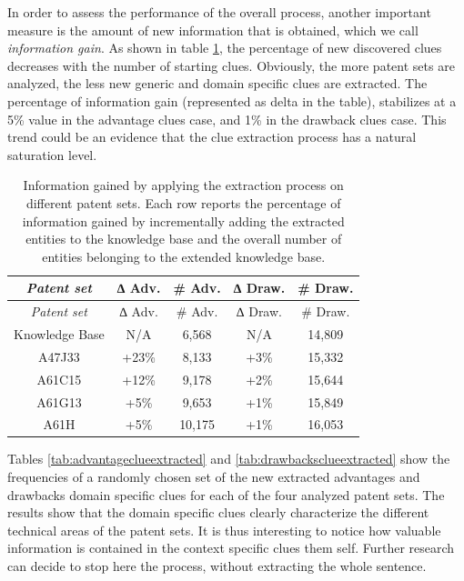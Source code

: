 \documentclass[b5paper,]{book}
\theoremstyle{definition}
\theoremstyle{definition}
\theoremstyle{definition}
\theoremstyle{remark}
\begin{document}
In order to assess the performance of the overall process, another
important measure is the amount of new information that is obtained,
which we call \emph{information gain}. As shown in table
\ref{tab:infogain1}, the percentage of new discovered clues decreases
with the number of starting clues. Obviously, the more patent sets are
analyzed, the less new generic and domain specific clues are extracted.
The percentage of information gain (represented as delta in the table),
stabilizes at a 5\% value in the advantage clues case, and 1\% in the
drawback clues case. This trend could be an evidence that the clue
extraction process has a natural saturation level.

\begin{longtable}[]{@{}ccccc@{}}
\caption{\label{tab:infogain1} Information gained by applying the extraction
process on different patent sets. Each row reports the percentage of
information gained by incrementally adding the extracted entities to the
knowledge base and the overall number of entities belonging to the
extended knowledge base.}\tabularnewline
\toprule
\emph{Patent set} & ∆ Adv. & \# Adv. & ∆ Draw. & \# Draw.\tabularnewline
\midrule
\endfirsthead
\toprule
\emph{Patent set} & ∆ Adv. & \# Adv. & ∆ Draw. & \# Draw.\tabularnewline
\midrule
\endhead
Knowledge Base & N/A & 6,568 & N/A & 14,809\tabularnewline
A47J33 & +23\% & 8,133 & +3\% & 15,332\tabularnewline
A61C15 & +12\% & 9,178 & +2\% & 15,644\tabularnewline
A61G13 & +5\% & 9,653 & +1\% & 15,849\tabularnewline
A61H & +5\% & 10,175 & +1\% & 16,053\tabularnewline
\bottomrule
\end{longtable}

Tables \ref{tab:advantageclueextracted} and
\ref{tab:drawbacksclueextracted} show the frequencies of a randomly
chosen set of the new extracted advantages and drawbacks domain specific
clues for each of the four analyzed patent sets. The results show that
the domain specific clues clearly characterize the different technical
areas of the patent sets. It is thus interesting to notice how valuable
information is contained in the context specific clues them self.
Further research can decide to stop here the process, without extracting
the whole sentence.
\end{document}
